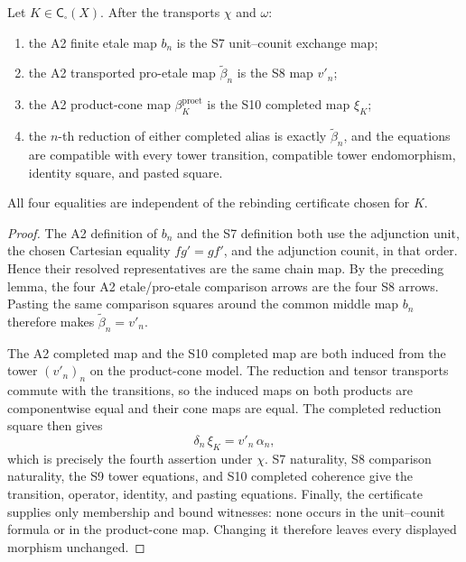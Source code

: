 \begin{lemma}
\label{lemma:weil-pbc-a2-s7-s10-endpoint-compatibility}
Let $K\in\mathsf C_\square(X)$.  After the transports $\chi$ and $\omega$:
\begin{enumerate}
\item the A2 finite etale map $b_n$ is the S7 unit--counit exchange map;
\item the A2 transported pro-etale map $\widetilde\beta_n$ is the S8 map
      $v'_n$;
\item the A2 product-cone map $\beta_K^{\mathrm{proet}}$ is the S10 completed
      map $\xi_K$;
\item the $n$-th reduction of either completed alias is exactly
      $\widetilde\beta_n$, and the equations are compatible with every tower
      transition, compatible tower endomorphism, identity square, and pasted
      square.
\end{enumerate}
All four equalities are independent of the rebinding certificate chosen for
$K$.
\end{lemma}
\begin{proof}

The A2 definition of $b_n$ and the S7 definition both use the adjunction unit,
the chosen Cartesian equality $fg'=gf'$, and the adjunction counit, in that
order.  Hence their resolved representatives are the same chain map.  By the
preceding lemma, the four A2 etale/pro-etale comparison arrows are the four S8
arrows.  Pasting the same comparison squares around the common middle map
$b_n$ therefore makes $\widetilde\beta_n=v'_n$.

The A2 completed map and the S10 completed map are both induced from the
tower $(v'_n)_n$ on the product-cone model.  The reduction and tensor
transports commute with the transitions, so the induced maps on both products
are componentwise equal and their cone maps are equal.  The completed
reduction square then gives
\[
 \delta_n\,\xi_K=v'_n\,\alpha_n,
\]
which is precisely the fourth assertion under $\chi$.  S7 naturality, S8
comparison naturality, the S9 tower equations, and S10 completed coherence
give the transition, operator, identity, and pasting equations.  Finally,
the certificate supplies only membership and bound witnesses: none occurs in
the unit--counit formula or in the product-cone map.  Changing it therefore
leaves every displayed morphism unchanged.
\end{proof}

